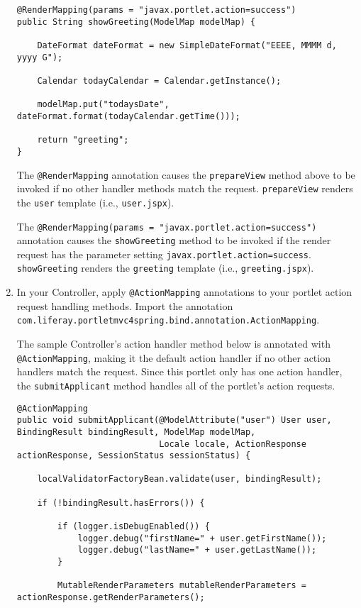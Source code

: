 \begin{enumerate}
\begin{verbatim}
@RenderMapping(params = "javax.portlet.action=success")
public String showGreeting(ModelMap modelMap) {

    DateFormat dateFormat = new SimpleDateFormat("EEEE, MMMM d, yyyy G");

    Calendar todayCalendar = Calendar.getInstance();

    modelMap.put("todaysDate", dateFormat.format(todayCalendar.getTime()));

    return "greeting";
}
\end{verbatim}

  The \texttt{@RenderMapping} annotation causes the \texttt{prepareView}
  method above to be invoked if no other handler methods match the
  request. \texttt{prepareView} renders the \texttt{user} template
  (i.e., \texttt{user.jspx}).

  The \texttt{@RenderMapping(params\ =\ "javax.portlet.action=success")}
  annotation causes the \texttt{showGreeting} method to be invoked if
  the render request has the parameter setting
  \texttt{javax.portlet.action=success}. \texttt{showGreeting} renders
  the \texttt{greeting} template (i.e., \texttt{greeting.jspx}).
\item
  In your Controller, apply \texttt{@ActionMapping} annotations to your
  portlet action request handling methods. Import the annotation
  \texttt{com.liferay.portletmvc4spring.bind.annotation.ActionMapping}.

  The sample Controller's action handler method below is annotated with
  \texttt{@ActionMapping}, making it the default action handler if no
  other action handlers match the request. Since this portlet only has
  one action handler, the \texttt{submitApplicant} method handles all of
  the portlet's action requests.

\begin{verbatim}
@ActionMapping
public void submitApplicant(@ModelAttribute("user") User user, BindingResult bindingResult, ModelMap modelMap,
                            Locale locale, ActionResponse actionResponse, SessionStatus sessionStatus) {

    localValidatorFactoryBean.validate(user, bindingResult);

    if (!bindingResult.hasErrors()) {

        if (logger.isDebugEnabled()) {
            logger.debug("firstName=" + user.getFirstName());
            logger.debug("lastName=" + user.getLastName());
        }

        MutableRenderParameters mutableRenderParameters = actionResponse.getRenderParameters();


\end{verbatim}
\end{enumerate}
